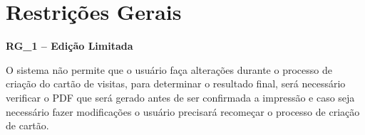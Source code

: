 \section{Restrições Gerais}

\textbf{RG\_1 – Edição Limitada}

O sistema não permite que o usuário faça alterações durante o processo de criação do cartão de visitas, para determinar o resultado final, será necessário verificar o PDF que será gerado antes de ser confirmada a impressão e caso seja necessário fazer modificações o usuário precisará recomeçar o processo de criação de cartão.
